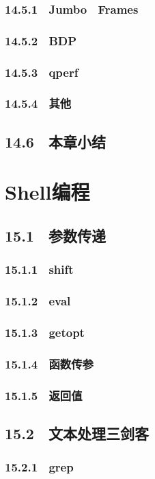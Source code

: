 \documentclass[12pt,UTF8]{ctexbook}
\begin{document}
{\subsection{14.5.1　Jumbo　Frames}
\subsection{14.5.2　BDP}
\subsection{14.5.3　qperf}
\subsection{14.5.4　其他}
\section{14.6　本章小结}
\chapter{Shell编程}
\section{15.1　参数传递}
\subsection{15.1.1　shift}
\subsection{15.1.2　eval}
\subsection{15.1.3　getopt}
\subsection{15.1.4　函数传参}
\subsection{15.1.5　返回值}
\section{15.2　文本处理三剑客}
\subsection{15.2.1　grep}
}
\end{document}
